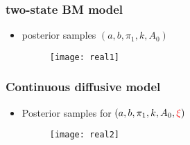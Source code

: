 \documentclass[11pt]{beamer}
\newcommand{\bit}{\begin{itemize}\setlength{\itemsep}{0cm}\setlength{\topsep}{0cm}}
\newcommand{\eit}{\end{itemize}}
\begin{document}
\begin{frame}
	\frametitle{two-state BM model}
	\bit
	\item posterior samples $(a,b,\pi_1,k,A_0)$
		\begin{figure}
			\centering
			\texttt{[image: real1]}
		\end{figure}
	\eit
\end{frame}
					
\begin{frame}
	\frametitle{Continuous diffusive model}
	\bit
\item Posterior samples for $(a,b,\pi_1,k,A_0,{\color{red} \xi})$
	\begin{figure}
		\centering
		\texttt{[image: real2]}
	\end{figure}
	\eit
\end{frame}
\end{document}
